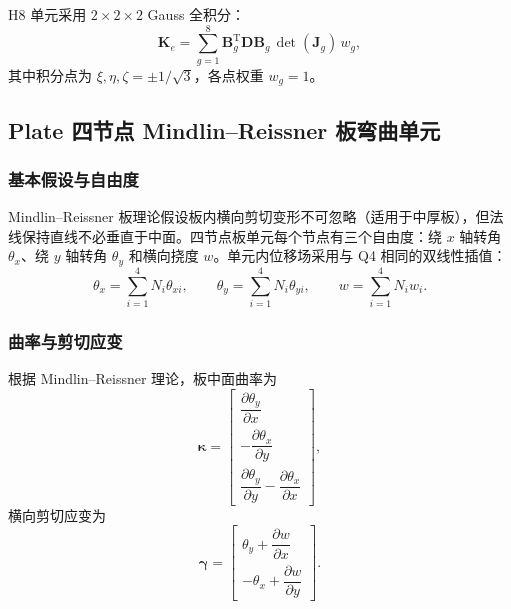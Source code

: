 \documentclass[UTF8,a4paper,zihao=-4]{ctexart}
\newcommand{\T}{\mathrm{T}}
\newcommand{\Dmat}{\bm{D}}
\newcommand{\Bmat}{\bm{B}}
\newcommand{\Kmat}{\bm{K}}
\begin{document}
H8 单元采用 $2\times2\times2$ Gauss 全积分：
\begin{equation}
    \Kmat_e =
    \sum_{g=1}^{8}
    \Bmat_g^{\T}\Dmat\Bmat_g\,
    \det(\bm{J}_g)\,w_g,
\end{equation}
其中积分点为 $\xi,\eta,\zeta=\pm1/\sqrt{3}$，各点权重 $w_g=1$。

\subsection{Plate 四节点 Mindlin--Reissner 板弯曲单元}

\subsubsection{基本假设与自由度}

Mindlin--Reissner 板理论假设板内横向剪切变形不可忽略（适用于中厚板），但法线保持直线不必垂直于中面。四节点板单元每个节点有三个自由度：绕 $x$ 轴转角 $\theta_x$、绕 $y$ 轴转角 $\theta_y$ 和横向挠度 $w$。单元内位移场采用与 Q4 相同的双线性插值：
\begin{equation}
    \theta_x = \sum_{i=1}^{4}N_i\theta_{xi},\qquad
    \theta_y = \sum_{i=1}^{4}N_i\theta_{yi},\qquad
    w = \sum_{i=1}^{4}N_i w_i.
\end{equation}

\subsubsection{曲率与剪切应变}

根据 Mindlin--Reissner 理论，板中面曲率为
\begin{equation}
    \bm{\kappa} =
    \begin{bmatrix}
        \dfrac{\partial\theta_y}{\partial x}\\[0.6em]
        -\dfrac{\partial\theta_x}{\partial y}\\[0.6em]
        \dfrac{\partial\theta_y}{\partial y}
        -\dfrac{\partial\theta_x}{\partial x}
    \end{bmatrix},
\end{equation}
横向剪切应变为
\begin{equation}
    \bm{\gamma} =
    \begin{bmatrix}
        \theta_y + \dfrac{\partial w}{\partial x}\\[0.6em]
        -\theta_x + \dfrac{\partial w}{\partial y}
    \end{bmatrix}.
\end{equation}
\end{document}
